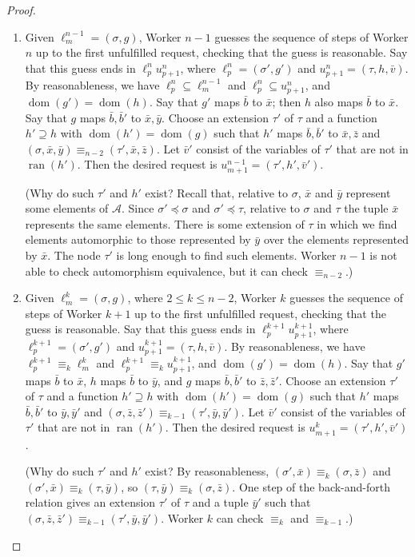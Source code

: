 \documentclass{article}
\DeclareMathOperator{\dom}{dom}
\DeclareMathOperator{\ran}{ran}
\theoremstyle{definition}
\begin{document}
\begin{proof}
\begin{enumerate}
			\item Given $\ell^{n-1}_m = (\sigma,g)$, Worker $n-1$ guesses the sequence of steps of Worker $n$ up to the first unfulfilled request, checking that the guess is reasonable. Say that this guess ends in $\ell^n_p u^n_{p+1}$, where $\ell^n_p = (\sigma',g')$ and $u^n_{p+1} = (\tau,h,\bar{v})$. By reasonableness, we have $\ell^n_p\subseteq\ell^{n-1}_m$ and $\ell^n_p\subseteq u^n_{p+1}$, and $\dom(g')=\dom(h)$. Say that $g'$ maps $\bar{b}$ to $\bar{x}$; then $h$ also maps $\bar{b}$ to $\bar{x}$. Say that $g$ maps $\bar{b},\bar{b}'$ to $\bar{x},\bar{y}$. Choose an extension $\tau'$ of $\tau$ and a function $h'\supseteq h$ with $\dom(h')=\dom(g)$ such that $h'$ maps $\bar{b},\bar{b}'$ to $\bar{x},\bar{z}$ and $(\sigma,\bar{x},\bar{y})\equiv_{n-2}(\tau',\bar{x},\bar{z})$. Let $\bar{v}'$ consist of the variables of $\tau'$ that are not in $\ran(h')$. Then the desired request is $u^{n-1}_{m+1}=(\tau',h',\bar{v}')$. \par (Why do such $\tau'$ and $h'$ exist? Recall that, relative to $\sigma$, $\bar{x}$ and $\bar{y}$ represent some elements of $\mathcal{A}$. Since $\sigma'\preceq\sigma$ and $\sigma'\preceq\tau$, relative to $\sigma$ and $\tau$ the tuple $\bar{x}$ represents the same elements. There is some extension of $\tau$ in which we find elements automorphic to those represented by $\bar{y}$ over the elements represented by $\bar{x}$. The node $\tau'$ is long enough to find such elements. Worker $n-1$ is not able to check automorphism equivalence, but it can check $\equiv_{n-2}$.)
			
			\item Given $\ell^k_m = (\sigma,g)$, where $2\leq k\leq n-2$, Worker $k$ guesses the sequence of steps of Worker $k+1$ up to the first unfulfilled request, checking that the guess is reasonable. Say that this guess ends in $\ell^{k+1}_p u^{k+1}_{p+1}$, where $\ell^{k+1}_p = (\sigma',g')$ and $u^{k+1}_{p+1} = (\tau,h,\bar{v})$. By reasonableness, we have $\ell^{k+1}_p\equiv_k\ell^k_m$ and $\ell^{k+1}_p\equiv_k u^{k+1}_{p+1}$, and $\dom(g')=\dom(h)$. Say that $g'$ maps $\bar{b}$ to $\bar{x}$, $h$ maps $\bar{b}$ to $\bar{y}$, and $g$ maps $\bar{b},\bar{b}'$ to $\bar{z},\bar{z}'$. Choose an extension $\tau'$ of $\tau$ and a function $h'\supseteq h$ with $\dom(h')=\dom(g)$ such that $h'$ maps $\bar{b},\bar{b}'$ to $\bar{y},\bar{y}'$ and $(\sigma,\bar{z},\bar{z}')\equiv_{k-1}(\tau',\bar{y},\bar{y}')$. Let $\bar{v}'$ consist of the variables of $\tau'$ that are not in $\ran(h')$. Then the desired request is $u^k_{m+1}=(\tau',h',\bar{v}')$. \par (Why do such $\tau'$ and $h'$ exist? By reasonableness, $(\sigma',\bar{x})\equiv_k(\sigma,\bar{z})$ and $(\sigma',\bar{x})\equiv_k(\tau,\bar{y})$, so $(\tau,\bar{y})\equiv_k(\sigma,\bar{z})$. One step of the back-and-forth relation gives an extension $\tau'$ of $\tau$ and a tuple $\bar{y}'$ such that $(\sigma,\bar{z},\bar{z}')\equiv_{k-1}(\tau',\bar{y},\bar{y}')$. Worker $k$ can check $\equiv_k$ and $\equiv_{k-1}$.)
			

\end{enumerate}
\end{proof}
\end{document}
